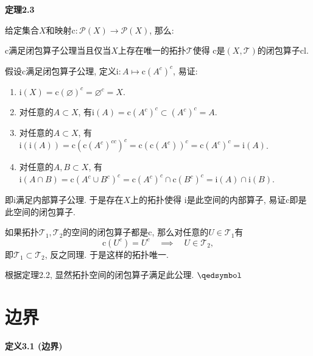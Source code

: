 \documentclass[UTF8]{ctexart}
\begin{document}
\vspace{10pt}

\hypertarget{sec:定理2.3}{}
\noindent\textbf{定理2.3}

给定集合$X$和映射$\mathrm{c}:\mathcal{P}(X)\to\mathcal{P}(X)$, 那么:

$\mathrm{c}$满足闭包算子公理当且仅当$X$上存在唯一的拓扑$\mathcal{T}$使得
$\mathrm{c}$是$(X,\mathcal{T})$的闭包算子$\mathrm{cl}$.



假设$\mathrm{c}$满足闭包算子公理, 定义$\mathrm{i}:A\mapsto\mathrm{c}(A^c)^c$, 易证:
\begin{enumerate}
    \item $\mathrm{i}(X)=\mathrm{c}(\varnothing)^c=\varnothing^c=X$.
    \item 对任意的$A\subset X$, 有$\mathrm{i}(A)=\mathrm{c}(A^c)^c\subset(A^c)^c=A$.
    \item 对任意的$A\subset X$, 有$\mathrm{i}(\mathrm{i}(A))=
    \mathrm{c}(\mathrm{c}(A^c)^{cc})^c=\mathrm{c}(\mathrm{c}(A^c))^c=
    \mathrm{c}(A^c)^c=\mathrm{i}(A)$.
    \item 对任意的$A,B\subset X$, 有$\mathrm{i}(A\cap B)=
    \mathrm{c}(A^c\cup B^c)^c=\mathrm{c}(A^c)^c\cap\mathrm{c}(B^c)^c
    =\mathrm{i}(A)\cap\mathrm{i}(B)$.
\end{enumerate}
即$\mathrm{i}$满足内部算子公理. 于是存在$X$上的拓扑使得
$\mathrm{i}$是此空间的内部算子, 易证$\mathrm{c}$即是此空间的闭包算子.

如果拓扑$\mathcal{T}_1,\mathcal{T}_2$的空间的闭包算子都是$\mathrm{c}$,
那么对任意的$U\in\mathcal{T}_1$有
\[
    \mathrm{c}(U^c)=U^c\quad\implies\quad U\in\mathcal{T}_2,
\]
即$\mathcal{T}_1\subset\mathcal{T}_2$, 反之同理. 于是这样的拓扑唯一.


根据定理2.2, 显然拓扑空间的闭包算子满足此公理. \hfill $\qedsymbol$






\vspace{20pt}

\section{边界}

\hypertarget{sec:定义3.1}{}
\noindent\textbf{定义3.1 (边界)}
\end{document}
